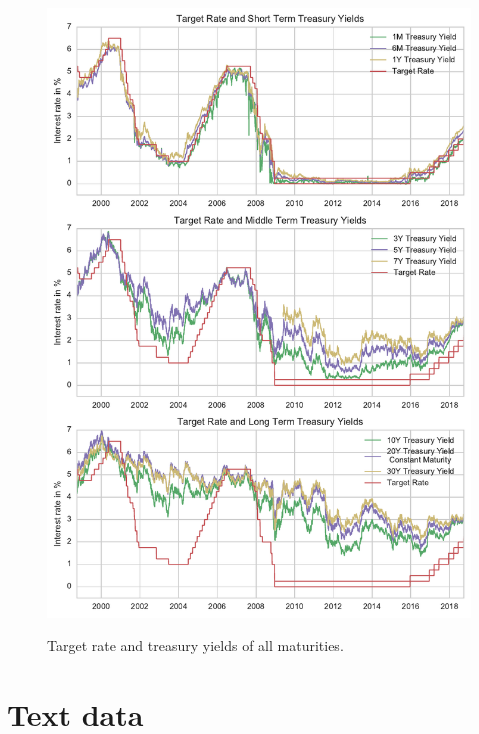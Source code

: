 \documentclass[11pt,a4paper,english,oneside]{book}
\numberwithin{equation}{chapter}
\begin{document}
\begin{figure}
	\caption{Target rate and treasury yields of all maturities.}
	\centering
	\includegraphics[scale=1]{Images/alltreasury.pdf}
	\label{alltreasury}
\end{figure}


\renewcommand{\theequation}{B.\arabic{equation}}


\chapter{Text data}\label{AppendixB}

\end{document}
